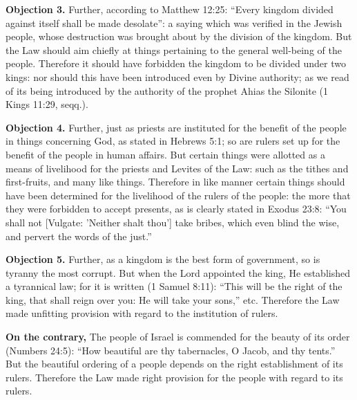 \textbf{Objection 3.} Further, according to Matthew 12:25: ``Every kingdom divided against itself shall be made desolate'': a saying which was verified in the Jewish people, whose destruction was brought about by the division of the kingdom. But the Law should aim chiefly at things pertaining to the general well-being of the people. Therefore it should have forbidden the kingdom to be divided under two kings: nor should this have been introduced even by Divine authority; as we read of its being introduced by the authority of the prophet Ahias the Silonite (1 Kings 11:29, seqq.).

\textbf{Objection 4.} Further, just as priests are instituted for the benefit of the people in things concerning God, as stated in Hebrews 5:1; so are rulers set up for the benefit of the people in human affairs. But certain things were allotted as a means of livelihood for the priests and Levites of the Law: such as the tithes and first-fruits, and many like things. Therefore in like manner certain things should have been determined for the livelihood of the rulers of the people: the more that they were forbidden to accept presents, as is clearly stated in Exodus 23:8: ``You shall not [Vulgate: 'Neither shalt thou'] take bribes, which even blind the wise, and pervert the words of the just.''

\textbf{Objection 5.} Further, as a kingdom is the best form of government, so is tyranny the most corrupt. But when the Lord appointed the king, He established a tyrannical law; for it is written (1 Samuel 8:11): ``This will be the right of the king, that shall reign over you: He will take your sons,'' etc. Therefore the Law made unfitting provision with regard to the institution of rulers.

\textbf{On the contrary,} The people of Israel is commended for the beauty of its order (Numbers 24:5): ``How beautiful are thy tabernacles, O Jacob, and thy tents.'' But the beautiful ordering of a people depends on the right establishment of its rulers. Therefore the Law made right provision for the people with regard to its rulers.

